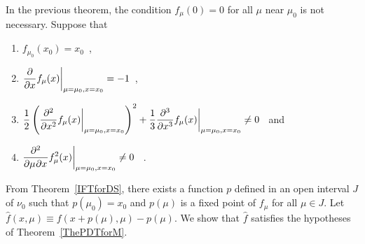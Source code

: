 \begin{rmk}
In the previous theorem, the condition $f_{\mu}(0)=0$ for all $\mu$
near $\mu_0$ is not necessary.  Suppose that
\begin{enumerate}
\item $\displaystyle f_{\mu_0}(x_0) = x_0$\ ,
\item $\displaystyle \pdfdx{f_{\mu}(x)}{x}\bigg|_{\mu=\mu_0,x=x_0} = -1$\ ,
\item $\displaystyle \frac{1}{2}
\left(\pdfdxn{f_{\mu}(x)}{x}{2}\bigg|_{\mu=\mu_0,x=x_0}\right)^2
+\frac{1}{3} \pdfdxn{f_{\mu}(x)}{x}{3}\bigg|_{\mu=\mu_0,x=x_0} \neq 0$ \ 
and
\item $\displaystyle \pdfdxnm{f_{\mu}^2(x)}{\mu}{x}{2}{}{}
\bigg|_{\mu=\mu_0,x=x_0} \neq 0$ \ .
\end{enumerate}
From Theorem~\ref{IFTforDS}, there exists a function
$p$ defined in an open interval $J$ of $\nu_0$ such that
$p(\mu_0)=x_0$ and $p(\mu)$ is a fixed point of $f_\mu$ for all $\mu \in J$.
Let $\hat{f}(x,\mu) \equiv f(x+p(\mu),\mu)-p(\mu)$.  We show that
$\hat{f}$ satisfies the hypotheses of Theorem~\ref{ThePDTforM}.


\end{rmk}
